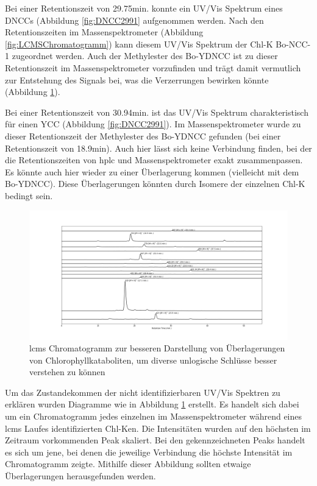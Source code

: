 Bei einer Retentionszeit von 29.75min. konnte ein UV/Vis Spektrum eines \gls{DNCC}s (Abbildung \ref{fig:DNCC2991} aufgenommen werden. Nach den Retentionszeiten im Massenspektrometer (Abbildung \ref{fig:LCMSChromatogramm}) kann diesem UV/Vis Spektrum der \gls{Chl-K} Bo-NCC-1 zugeordnet werden. Auch der Methylester des Bo-YDNCC ist zu dieser Retentionszeit im Massenspektrometer vorzufinden und trägt damit vermutlich zur Entstehung des Signals bei, was die Verzerrungen bewirken könnte (Abbildung \ref{fig:LCMSChromatogrammAufspaltung}).

Bei einer Retentionszeit von 30.94min. ist das UV/Vis Spektrum charakteristisch für einen \gls{YCC} (Abbildung \ref{fig:DNCC2991}). Im Massenspektrometer wurde zu dieser Retentionszeit der Methylester des Bo-YDNCC gefunden (bei einer Retentionszeit von 18.9min). Auch hier lässt sich keine Verbindung finden, bei der die Retentionszeiten von \gls{hplc} und Massenspektrometer exakt zusammenpassen. Es könnte auch hier wieder zu einer Überlagerung kommen (vielleicht mit dem Bo-YDNCC). Diese Überlagerungen könnten durch Isomere der einzelnen \gls{Chl-K} bedingt sein. \\

\begin{figure}[!htbp]
  \includegraphics[width=\textwidth]{figures/Kapitel6/keineReaktion/Kuerbis_Analyse_keineReaktion2_LC-ESI-MS.png}
  \caption[LC-MS Chromatogramm vor der Reaktion Aufspaltung, Quelle: Autor]{\gls{lcms} Chromatogramm zur besseren Darstellung von Überlagerungen von Chlorophyllkataboliten, um diverse unlogische Schlüsse besser verstehen zu können}
  \label{fig:LCMSChromatogrammAufspaltung}
\end{figure} 

Um das Zustandekommen der nicht identifizierbaren UV/Vis Spektren zu erklären wurden Diagramme wie in Abbildung \ref{fig:LCMSChromatogrammAufspaltung} erstellt. Es handelt sich dabei um ein Chromatogramm jedes einzelnen im Massenspektrometer während eines \gls{lcms} Laufes identifizierten \gls{Chl-K}en. Die Intensitäten wurden auf den höchsten im Zeitraum vorkommenden Peak skaliert. Bei den gekennzeichneten Peaks handelt es sich um jene, bei denen die jeweilige Verbindung die höchste Intensität im Chromatogramm zeigte. Mithilfe dieser Abbildung sollten etwaige Überlagerungen herausgefunden werden. 

